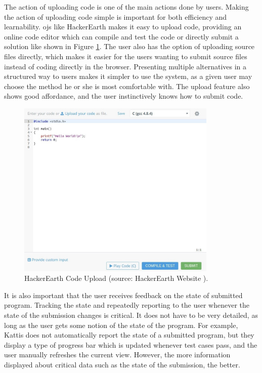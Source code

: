 The action of uploading code is one of the main actions done by users. Making the action of uploading code simple is important for both efficiency and learnability. \glspl{oj} like HackerEarth makes it easy to upload code, providing an online code editor which can compile and test the code or directly submit a solution like shown in Figure \ref{fig:hackerearth-upload}. The user also has the option of uploading source files directly, which makes it easier for the users wanting to submit source files instead of coding directly in the browser. Presenting multiple alternatives in a structured way to users makes it simpler to use the system, as a given user may choose the method he or she is most comfortable with. The upload feature also shows good affordance, and the user instinctively knows how to submit code. \\

\begin{figure}
    \centering
    \includegraphics[width=0.85\textwidth]{figs/hackerearth_upload.jpg}
    \caption[HackerEarth Code Upload.]{HackerEarth Code Upload (source: HackerEarth Website \cite{HACKEREARTH}).}
    \label{fig:hackerearth-upload}
\end{figure}

It is also important that the user receives feedback on the state of submitted program. Tracking the state and repeatedly reporting to the user whenever the state of the submission changes is critical. It does not have to be very detailed, as long as the user gets some notion of the state of the program. For example, Kattis does not automatically report the state of a submitted program, but they display a type of progress bar which is updated whenever test cases pass, and the user manually refreshes the current view. However, the more information displayed about critical data such as the state of the submission, the better. \\

